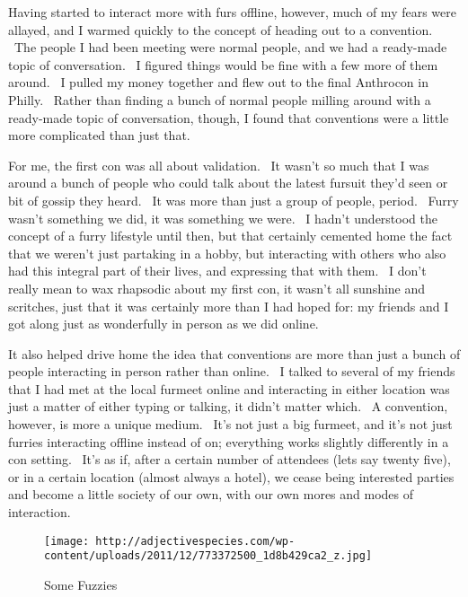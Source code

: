 Having started to interact more with furs offline, however, much of my
fears were allayed, and I warmed quickly to the concept of heading out
to a convention. ~The people I had been meeting were normal people, and
we had a ready-made topic of conversation. ~I figured things would be
fine with a few more of them around. ~I pulled my money together and
flew out to the final Anthrocon in Philly. ~Rather than finding a bunch
of normal people milling around with a ready-made topic of conversation,
though, I found that conventions were a little more complicated than
just that.

For me, the first con was all about validation. ~It wasn't so much that
I was around a bunch of people who could talk about the latest fursuit
they'd seen or bit of gossip they heard. ~It was more than just a group
of people, period. ~Furry wasn't something we did, it was something we
were. ~I hadn't understood the concept of a furry lifestyle until then,
but that certainly cemented home the fact that we weren't just partaking
in a hobby, but interacting with others who also had this integral part
of their lives, and expressing that with them. ~I don't really mean to
wax rhapsodic about my first con, it wasn't all sunshine and scritches,
just that it was certainly more than I had hoped for: my friends and I
got along just as wonderfully in person as we did online.

It also helped drive home the idea that conventions are more than just a
bunch of people interacting in person rather than online. ~I talked to
several of my friends that I had met at the local furmeet online and
interacting in either location was just a matter of either typing or
talking, it didn't matter which. ~A convention, however, is more a
unique medium. ~It's not just a big furmeet, and it's not just furries
interacting offline instead of on; everything works slightly differently
in a con setting. ~It's as if, after a certain number of attendees (lets
say twenty five), or in a certain location (almost always a hotel), we
cease being interested parties and become a little society of our own,
with our own mores and modes of interaction.

\begin{figure}[htbp]
\centering
\texttt{[image: http://adjectivespecies.com/wp-content/uploads/2011/12/773372500\_1d8b429ca2\_z.jpg]}
\caption{Some Fuzzies}
\end{figure}

